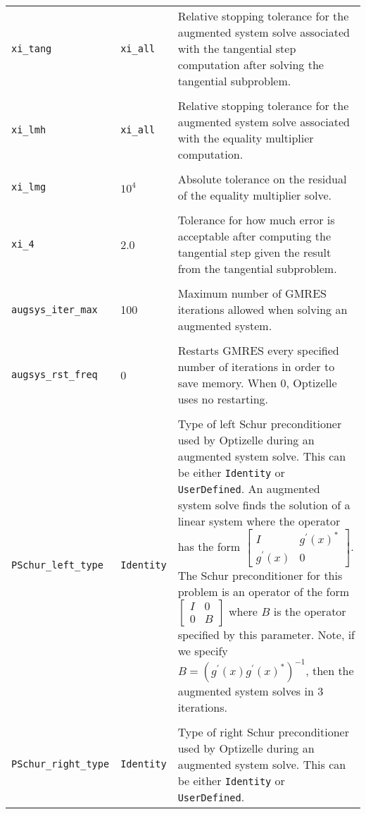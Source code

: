 \documentclass{report}
\begin{document}
\begin{longtable}{llp{}}
\\
\texttt{xi\_tang} & \texttt{xi\_all} & Relative stopping tolerance for the augmented system solve associated with the tangential step computation after solving the tangential subproblem. \\
\\
\texttt{xi\_lmh} & \texttt{xi\_all} & Relative stopping tolerance for the augmented system solve associated with the equality multiplier computation.\\
\\
\texttt{xi\_lmg} & $10^4$ & Absolute tolerance on the residual of the equality multiplier solve. \\
\\
\texttt{xi\_4} & 2.0 & Tolerance for how much error is acceptable after computing the tangential step given the result from the tangential subproblem.\\
\\
\texttt{augsys\_iter\_max} & 100 & Maximum number of GMRES iterations allowed when solving an augmented system.\\
\\
\texttt{augsys\_rst\_freq} & 0 & Restarts GMRES every specified number of iterations in order to save memory.  When 0, Optizelle uses no restarting.\\
\\
\texttt{PSchur\_left\_type} & \texttt{Identity} & Type of left Schur preconditioner used by Optizelle during an augmented system solve.  This can be either \texttt{Identity} or \texttt{UserDefined}.  An augmented system solve finds the solution of a linear system where the operator has the form $\begin{bmatrix} I & g^\prime(x)^*\\g^\prime(x) & 0\end{bmatrix}$.  The Schur preconditioner for this problem is an operator of the form $\begin{bmatrix} I & 0\\ 0 & B\end{bmatrix}$ where $B$ is the operator specified by this parameter.  Note, if we specify $B=(g^\prime(x)g^\prime(x)^*)^{-1}$, then the augmented system solves in 3 iterations.\\
\\
\texttt{PSchur\_right\_type} & \texttt{Identity} & Type of right Schur preconditioner used by Optizelle during an augmented system solve.  This can be either \texttt{Identity} or \texttt{UserDefined}.
\end{longtable}
\end{document}

